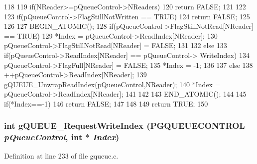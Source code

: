 \begin{DoxyCode}
118 {
119         if(NReader>=pQueueControl->NReaders){
120                 return FALSE;
121         }
122 
123         if(pQueueControl->FlagStillNotWritten == TRUE){
124                 return FALSE;
125         }
126     
127 BEGIN_ATOMIC();
128         if(pQueueControl->FlagStillNotRead[NReader] == TRUE){
129                 *Index = pQueueControl->ReadIndex[NReader];
130                 pQueueControl->FlagStillNotRead[NReader] = FALSE;
131         }
132         else{
133                 if(pQueueControl->ReadIndex[NReader] == pQueueControl->
      WriteIndex){
134                         pQueueControl->FlagFull[NReader] = FALSE;       
135                         *Index = -1;
136                 }
137                 else{
138                         ++pQueueControl->ReadIndex[NReader];
139                         gQUEUE_UnwrapReadIndex(pQueueControl,NReader);
140                         *Index = pQueueControl->ReadIndex[NReader];
141                 }
142         }
143 END_ATOMIC();
144 
145         if(*Index==-1){
146                 return FALSE;
147         }  
148 
149     return TRUE;
150 }                      
\end{DoxyCode}
\subsubsection[{gQUEUE\_\-RequestWriteIndex}]{\setlength{\rightskip}{0pt plus 5cm}int gQUEUE\_\-RequestWriteIndex ({\bf PGQUEUECONTROL} {\em pQueueControl}, \/  int $\ast$ {\em Index})}\label{gqueue_8h_a7324fa957e7713c05cab4eb7993dc2ee}


Definition at line 233 of file gqueue.c.


